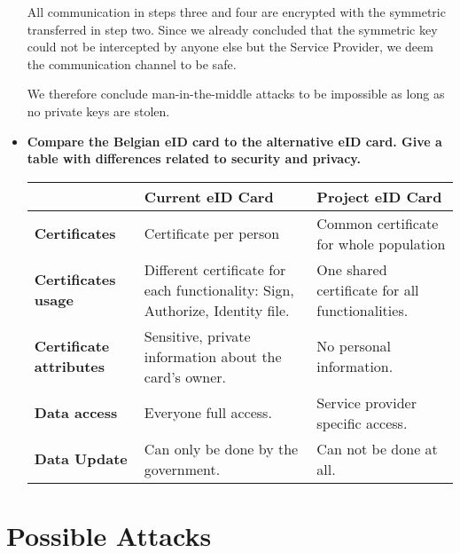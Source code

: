 \documentclass[12pt]{report}
\begin{document}
\begin{itemize}
All communication in steps three and four are encrypted with the symmetric transferred in step two. Since we already concluded that the symmetric key could not be intercepted by anyone else but the Service Provider, we deem the communication channel to be safe.

We therefore conclude man-in-the-middle attacks to be impossible as long as no private keys are stolen.

\item \textbf{Compare the Belgian eID card to the alternative eID card. Give a table with differences related to security and privacy.}\\

\begin{tabularx}{\textwidth}{|X|X|X|}
\hline
& \textbf{Current eID Card} & \textbf{Project eID Card}\\
\hline
\textbf{Certificates} & Certificate per person & Common certificate for whole population \\
\hline
\textbf{Certificates usage} & Different certificate for each functionality: Sign, Authorize, Identity file. & One shared certificate for all functionalities.\\
\hline
\textbf{Certificate attributes} & Sensitive, private information about the card's owner. & No personal information.\\
\hline
\textbf{Data access} & Everyone full access. & Service provider specific access.
\\
\hline
\textbf{Data Update} & Can only be done by the government. & Can not be done at all.\\
\hline
\end{tabularx}

\end{itemize}

\section{Possible Attacks}
\end{document}
